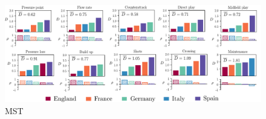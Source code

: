 \documentclass[]{article}
\begin{document}
\begin{figure}[t!]
\centering
\includegraphics[width=1.\textwidth]{fig_mst.pdf}
\caption{MST}
\label{}
\end{figure}










	
\end{document}
